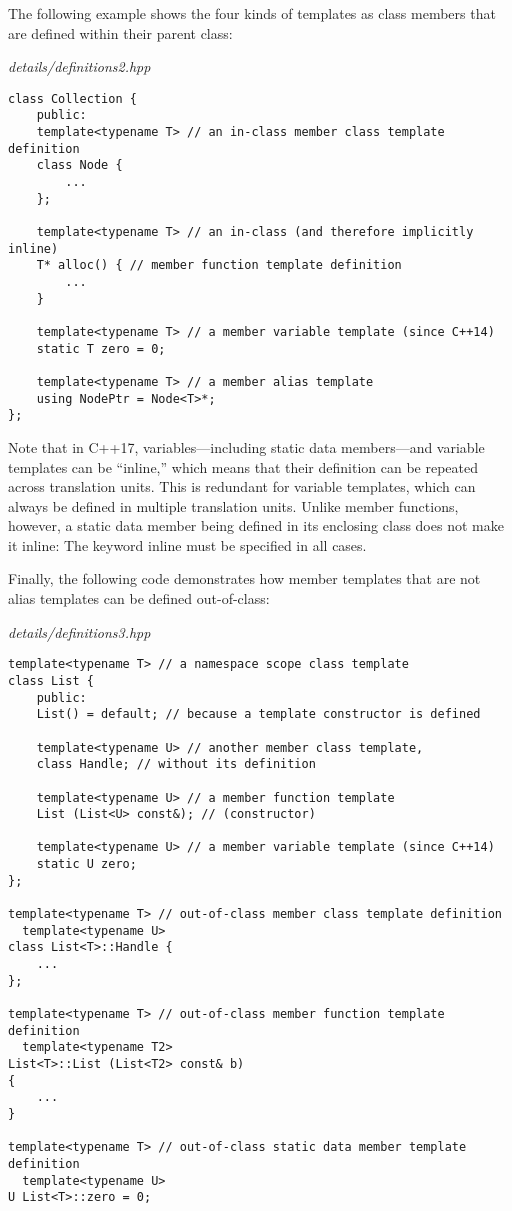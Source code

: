 The following example shows the four kinds of templates as class members that are defined within their parent class:

\noindent
\textit{details/definitions2.hpp}
\begin{lstlisting}[style=styleCXX]
class Collection {
	public:
	template<typename T> // an in-class member class template definition
	class Node {
		...
	};

	template<typename T> // an in-class (and therefore implicitly inline)
	T* alloc() { // member function template definition
		...
	}

	template<typename T> // a member variable template (since C++14)
	static T zero = 0;
	
	template<typename T> // a member alias template
	using NodePtr = Node<T>*;
};
\end{lstlisting}

Note that in C++17, variables—including static data members—and variable templates can be “inline,” which means that their definition can be repeated across translation units. This is redundant for variable templates, which can always be defined in multiple translation units. Unlike member functions, however, a static data member being defined in its enclosing class does not make it inline: The keyword inline must be specified in all cases.

Finally, the following code demonstrates how member templates that are not alias templates can be defined out-of-class:

\noindent
\textit{details/definitions3.hpp}
\begin{lstlisting}[style=styleCXX]
template<typename T> // a namespace scope class template
class List {
	public:
	List() = default; // because a template constructor is defined
	
	template<typename U> // another member class template,
	class Handle; // without its definition
	
	template<typename U> // a member function template
	List (List<U> const&); // (constructor)
	
	template<typename U> // a member variable template (since C++14)
	static U zero;
};

template<typename T> // out-of-class member class template definition
  template<typename U>
class List<T>::Handle {
	...
};

template<typename T> // out-of-class member function template definition
  template<typename T2>
List<T>::List (List<T2> const& b)
{
	...
}

template<typename T> // out-of-class static data member template definition
  template<typename U>
U List<T>::zero = 0;
\end{lstlisting}

